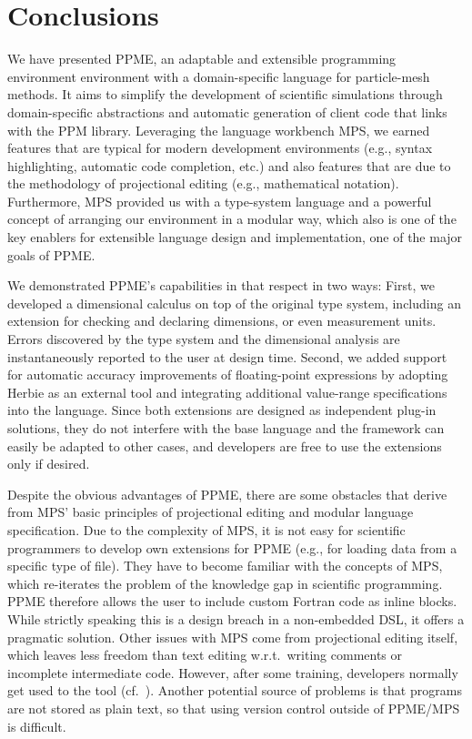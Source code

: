 \section{Conclusions}
\label{sec:conclusions}
We have presented PPME, an adaptable and extensible programming environment environment with a domain-specific language for particle-mesh methods.
It aims to simplify the development of scientific simulations through domain-specific abstractions and automatic generation of client code that links with the PPM library.
Leveraging the language workbench MPS, we earned features that are typical for 
modern development environments (e.g., syntax highlighting, automatic code completion, etc.) and
also features that are due to the methodology of projectional editing (e.g., mathematical 
notation). Furthermore, MPS provided us with a type-system language and a powerful
concept of arranging our environment in a modular way, which also is one of the key enablers 
for extensible language design and implementation, one of the major goals of PPME.

We demonstrated PPME's capabilities in that respect
in two ways: First, we developed a dimensional calculus on top of the original type system,
including an extension for checking and declaring dimensions, or even measurement units.
Errors discovered by the type system and the dimensional analysis are instantaneously reported to the user at design time. 
Second, we added support for automatic accuracy improvements of floating-point
expressions by adopting Herbie as an external tool and integrating additional 
value-range specifications into the language. Since both extensions are designed  
as independent plug-in solutions, they do not interfere with the base language and
the framework can easily be adapted to other cases, and developers are free to use 
the extensions only if desired.

Despite the obvious advantages of PPME, there are some obstacles that derive from MPS' basic principles of projectional
editing and modular language specification. 
Due to the complexity of MPS, it is not easy for scientific programmers to 
develop own extensions for PPME (e.g., for loading data from
a specific type of file). They have to become familiar with the concepts of MPS, which re-iterates 
the problem of the knowledge gap in scientific programming. PPME therefore allows the user to include custom Fortran code as inline blocks. While strictly speaking this is a design breach in a non-embedded DSL, it offers a pragmatic solution. Other issues with MPS come from 
projectional editing itself, which leaves less freedom than text editing w.r.t.~writing
comments or incomplete intermediate code. However, after some training, developers normally
get used to the tool (cf.~\cite{Voelter2013}). Another potential source of problems is that
programs are not stored as plain text, so that using version control outside of PPME/MPS is difficult.

